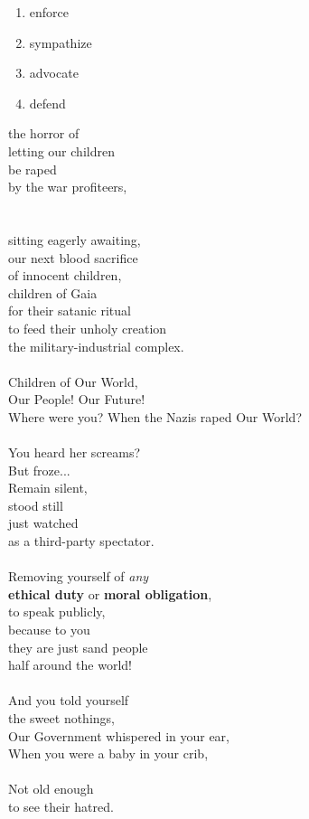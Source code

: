 \documentclass[16pt,openany,oneside]{book}
\begin{document}
\begin{enumerate}
    \item enforce 
    \item sympathize
    \item advocate 
    \item defend
\end{enumerate}

the horror of \\  
letting our children \\ 
be raped \\ 
by the war profiteers, \\ 
\\\\
sitting eagerly awaiting, \\  
our next blood sacrifice \\  
of innocent children, \\  
children of Gaia \\ 
for their satanic ritual \\ 
to feed their unholy creation \\ 
the military-industrial complex.
\\\\
Children of Our World, \\ 
Our People! Our Future! \\
Where were you? 
When the Nazis 
raped Our World?
\\\\
You heard her screams? \\
But froze... \\
Remain silent, \\ 
stood still \\  
just watched \\ 
as a third-party spectator.
\\\\
Removing yourself of \textit{any} \\ 
\textbf{ethical duty} or \textbf{moral obligation}, \\ 
to speak publicly, \\ 
because to you \\ 
they are just sand people \\ 
half around the world!
\\\\
And you told yourself \\ 
the sweet nothings, \\ 
Our Government whispered in your ear, \\ 
When you were a baby in your crib, 
\\\\
Not old enough \\ 
to see their hatred. \\
\end{document}
